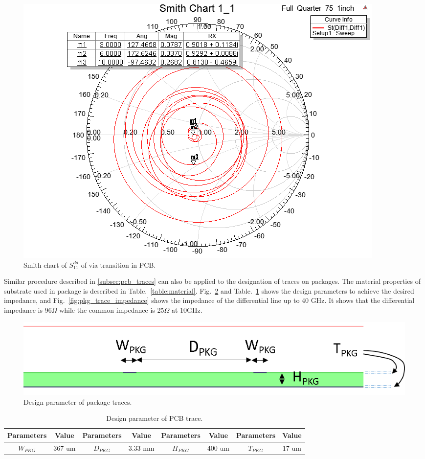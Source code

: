 \documentclass{book}  %
\renewcommand{\subsection}[1]{\psubsection{#1}}
\begin{document}
\begin{paper}
\begin{figure}[htbp!]
	\centering
	\includegraphics[width=0.8\columnwidth]{./img/PCB/Via_Transition/via_transition_smith.png}
	\caption{Smith chart of $S^{dd}_{11}$ of via transition in PCB.}
	\label{fig:pcb_via_tran_Sdd11_smith} %
\end{figure}

\subsection{Package Traces}
Similar procedure described in \ref{subsec:pcb_traces} can also be applied to the designation of traces on packages. The material properties of substrate used in package is described in Table.~\ref{table:material}.  Fig.~\ref{fig:pkg_trace} and Table.~\ref{table:pkg_trace} shows the design parameters to achieve the desired impedance, and Fig.~\ref{fig:pkg_trace_impedance} shows the impedance of the differential line up to 40 GHz. It shows that the differential impedance is 96$\Omega$ while the common impedance is 25$\Omega$ at 10GHz.

\begin{figure}[htbp!]
	\centering
	\includegraphics[width=0.8\columnwidth]{./img/PCB/differential_PKG_2D_CrossSection.png}
	\caption{Design parameter of package traces.}
	\label{fig:pkg_trace} %
\end{figure}

\begin{table}[htbp!]
	\renewcommand{\arraystretch}{1.3}	
	\begin{center}
		\begin{tabular}{| c | c | c | c | c | c | c | c |}
			\hline
			Parameters  & Value  & Parameters & Value  & Parameters & Value  & Parameters & Value \\ \hline
			$W_{PKG}$   & 367 um & $D_{PKG}$  & 3.33 mm& $H_{PKG}$  & 400 um & $T_{PKG}$  & 17 um \\
			\hline
		\end{tabular}
	\end{center}
	\label{table:pkg_trace}
	\caption{Design parameter of PCB trace.}
	\vskip0.2in
\end{table}


\end{paper}
\end{document}
